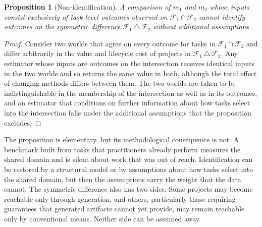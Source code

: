 \documentclass[11pt]{article}
\newtheorem{proposition}{Proposition}
\theoremstyle{remark}
\newcommand{\F}{\mathcal{F}}
\begin{document}
\begin{proposition}[Non-identification]
A comparison of $m_1$ and $m_2$ whose inputs consist exclusively of task-level outcomes observed on $\F_1\cap\F_2$ cannot identify outcomes on the symmetric difference $\F_1\,\triangle\,\F_2$ without additional assumptions.
\end{proposition}

\begin{proof}
Consider two worlds that agree on every outcome for tasks in $\F_1\cap\F_2$ and differ arbitrarily in the value and lifecycle cost of projects in $\F_1\,\triangle\,\F_2$. Any estimator whose inputs are outcomes on the intersection receives identical inputs in the two worlds and so returns the same value in both, although the total effect of changing methods differs between them. The two worlds are taken to be indistinguishable in the membership of the intersection as well as in its outcomes, and an estimator that conditions on further information about how tasks select into the intersection falls under the additional assumptions that the proposition excludes.
\end{proof}

The proposition is elementary, but its methodological consequence is not. A benchmark built from tasks that practitioners already perform measures the shared domain and is silent about work that was out of reach. Identification can be restored by a structural model or by assumptions about how tasks select into the shared domain, but then the assumptions carry the weight that the data cannot. The symmetric difference also has two sides. Some projects may become reachable only through generation, and others, particularly those requiring guarantees that generated artifacts cannot yet provide, may remain reachable only by conventional means. Neither side can be assumed away.
\end{document}
